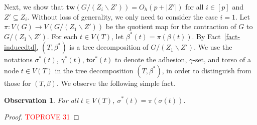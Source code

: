 \documentclass[a4paper,11pt]{article}
\numberwithin{lemma}{section}
\newtheorem{observation}[lemma]{Observation}
\newcommand{\tw}{\mathbf{tw}}
\newcommand{\tor}{\mathsf{tor}}
\begin{document}
Next, we show that $\tw(G/(Z_i \backslash Z')) = O_h(p+|Z'|)$ for all $i \in [p]$ and $Z' \subseteq Z_i$.
Without loss of generality, we only need to consider the case $i=1$.
Let $\pi\colon V(G) \rightarrow V(G/(Z_1 \backslash Z'))$ be the quotient map for the contraction of $G$ to $G/(Z_1 \backslash Z')$.
For each $t \in V(T)$, let $\beta^*(t) = \pi(\beta(t))$.
By Fact~\ref{fact-inducedtd}, $(T,\beta^*)$ is a tree decomposition of $G/(Z_1 \backslash Z')$.
We use the notations $\sigma^*(t)$, $\gamma^*(t)$, $\tor^*(t)$ to denote the adhesion, $\gamma$-set, and torso of a node $t \in V(T)$ in the tree decomposition $(T,\beta^*)$, in order to distinguish from those for $(T,\beta)$.
We observe the following simple fact.

\begin{observation} \label{obs-adhesion}
For all $t \in V(T)$, $\sigma^*(t) = \pi(\sigma(t))$.
\end{observation}
\begin{proof}\textcolor{red}{TOPROVE 31}\end{proof}
\end{document}
